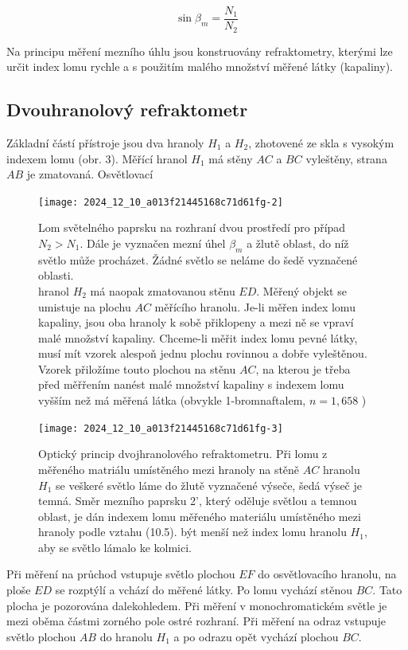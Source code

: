 \documentclass[czech,11pt,a4paper]{article}
\begin{document}
\begin{multicols}{2}
	
	\begin{equation}
		\sin \beta_{m}=\frac{N_{1}}{N_{2}}
	\end{equation}
	
	
	Na principu měření mezního úhlu jsou konstruovány refraktometry, kterými lze určit index lomu rychle a s použitím malého množství měřené látky (kapaliny).
	
	\subsection*{Dvouhranolový refraktometr}
	Základní částí přístroje jsou dva hranoly $H_{1}$ a $H_{2}$, zhotovené ze skla s vysokým indexem lomu (obr. 3). Měřící hranol $H_{1}$ má stěny $A C$ a $B C$ vyleštěny, strana $A B$ je zmatovaná. Osvětlovací\\
	\begin{figure}[H]
			\texttt{[image: 2024\_12\_10\_a013f21445168c71d61fg-2]}
			\caption{Lom světelného paprsku na rozhraní dvou prostředí pro případ $N_{2}>N_{1}$. Dále je vyznačen mezní úhel $\beta_{m}$ a žlutě oblast, do níž světlo může procházet. Žádné světlo se neláme do šedě vyznačené oblasti.\\
				hranol $H_{2}$ má naopak zmatovanou stěnu $E D$. Měřený objekt se umistuje na plochu $A C$ měřícího hranolu. Je-li měřen index lomu kapaliny, jsou oba hranoly k sobě přiklopeny a mezi ně se vpraví malé množství kapaliny. Chceme-li měřit index lomu pevné látky, musí mít vzorek alespoň jednu plochu rovinnou a dobře vyleštěnou. Vzorek přiložíme touto plochou na stěnu $A C$, na kterou je třeba před měřřením nanést malé množství kapaliny s indexem lomu vyšším než má měřená látka (obvykle 1-bromnaftalem, $n=1,658$ )}
	\end{figure}
	
	
	
	\begin{figure}[H]
		\texttt{[image: 2024\_12\_10\_a013f21445168c71d61fg-3]}
	
	\caption{Optický princip dvojhranolového refraktometru. Při lomu z měřeného matriálu umístěného mezi hranoly na stěně $A C$ hranolu $H_{1}$ se veškeré světlo láme do žlutě vyznačené výseče, šedá výseč je temná. Směr mezního paprsku 2', který oděluje světlou a temnou oblast, je dán indexem lomu měřeného materiálu umístěného mezi hranoly podle vztahu (10.5). být menší než index lomu hranolu $H_{1}$, aby se světlo lámalo ke kolmici.}
	\end{figure}
	
	Při měření na průchod vstupuje světlo plochou $E F$ do osvětlovacího hranolu, na ploše $E D$ se rozptýlí a vchází do měřené látky. Po lomu vychází stěnou $B C$. Tato plocha je pozorována dalekohledem. Při měření v monochromatickém světle je mezi oběma částmi zorného pole ostré rozhraní. Při měření na odraz vstupuje světlo plochou $A B$ do hranolu $H_{1}$ a po odrazu opět vychází plochou $B C$.
	

\end{multicols}
\end{document}
